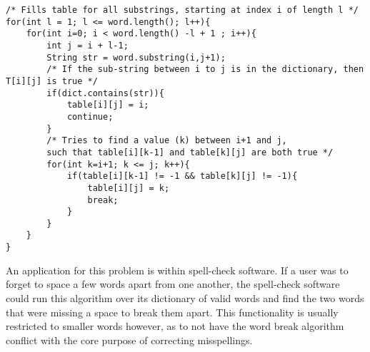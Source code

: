\begin{lstlisting}
/* Fills table for all substrings, starting at index i of length l */
for(int l = 1; l <= word.length(); l++){
	for(int i=0; i < word.length() -l + 1 ; i++){
		int j = i + l-1;
		String str = word.substring(i,j+1);
		/* If the sub-string between i to j is in the dictionary, then T[i][j] is true */
		if(dict.contains(str)){
			table[i][j] = i;
			continue;
		}
		/* Tries to find a value (k) between i+1 and j, 
		such that table[i][k-1] and table[k][j] are both true */
		for(int k=i+1; k <= j; k++){
			if(table[i][k-1] != -1 && table[k][j] != -1){
				table[i][j] = k;
				break;
			}
		}
	}
}
\end{lstlisting}

An application for this problem is within spell-check software. If a user was to forget to space a few words apart from one another, the spell-check software could run this algorithm over its dictionary of valid words and find the two words that were missing a space to break them apart. This functionality is usually restricted to smaller words however, as to not have the word break algorithm conflict with the core purpose of correcting misspellings. 
